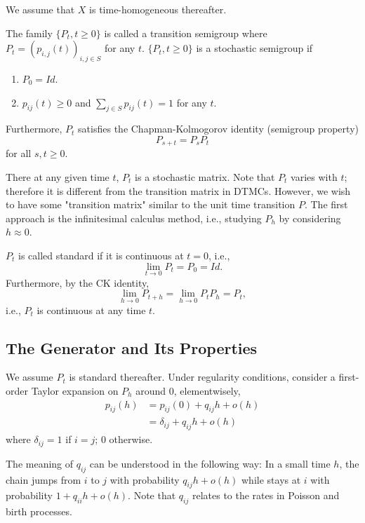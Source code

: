 \documentclass[11pt,twoside]{article}
\begin{document}
We assume that $X$ is time-homogeneous thereafter. 

\begin{definition}
The family $\{P_t, t \geq 0\}$ is called a transition semigroup where $P_t = (p_{i,j}(t))_{i,j \in S}$ for any $t$. $\{P_t, t \geq 0\}$ is a stochastic semigroup if
\begin{enumerate}
    \item $P_0 = Id$.
    \item $p_{ij}(t) \geq 0$ and $\sum_{j \in S} p_{ij}(t)  = 1$ for any $t$.
\end{enumerate}
 Furthermore, $P_t$ satisfies the Chapman-Kolmogorov identity (semigroup property)
\[
P_{s+t} = P_s P_t
\]
for all $s, t \geq 0$.
\end{definition}

There at any given time $t$, $P_t$ is a stochastic matrix. Note that $P_t$ varies with $t$; therefore it is different from the transition matrix in DTMCs. However, we wish to have some "transition matrix" similar to the unit time transition $P$. The first approach is the infinitesimal calculus method, i.e., studying $P_h$ by considering $h \approx 0$.

\begin{definition}
    $P_t$ is called standard if it is continuous at $t=0$, i.e.,
    \[
    \lim_{t \to 0}P_t = P_0 = Id.
    \]
    Furthermore, by the CK identity,
    \[
    \lim_{h \to 0}P_{t+h} = \lim_{h \to 0} P_t P_h = P_t,
    \]
    i.e., $P_t$ is continuous at any time $t$.
\end{definition}

\subsection{The Generator and Its Properties}
We assume $P_t$ is standard thereafter. Under regularity conditions, consider a first-order Taylor expansion on $P_h$ around $0$, elementwisely,
\begin{align*}
    p_{ij}(h) &= p_{ij}(0) + q_{ij}h + {o(h)} \\
    &= \delta_{ij} + q_{ij}h + {o(h)}
\end{align*}
where $\delta_{ij} = 1$ if $i=j$; 0 otherwise. 

The meaning of $q_{ij}$ can be understood in the following way: In a small time $h$, the chain jumps from $i$ to $j$ with probability $q_{ij}h + o(h)$ while stays at $i$ with probability $1+q_{ii}h + o(h)$. Note that $q_{ij}$ relates to the rates in Poisson and birth processes.
\end{document}
